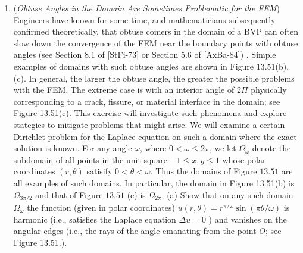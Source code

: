 \documentclass[../main.tex]{subfiles}
\begin{document}
\begin{enumerate}
(a) Write a MATLAB program that will perform the above adaptive scheme on the BVP and initial triangulation of Example 13.5. What happens when you run this program? Repeat, but now change the flagging criterion in (iii) to be that the oscillation of the FEM solution over an element exceeds $1 / 10$. Repeat with $1 / 10$ replaced by $1 / 100$. Plot each refined mesh as well as the final FEM solution.\\
(b) Repeat the instructions of part (a) on the BVP of Exercise 2; compare the final FEM solution with the exact solution given there.\\
(c) Repeat the instructions of part (a) on the BVP of Exercise 3 (using the initial triangulation given there).\\
(d) Do you have any ideas for an altemative mesh refinement scheme (satisfying the two constraints mentioned above)?
	\item (\textit{Obtuse Angles in the Domain Are Sometimes Problematic for the FEM}) Engineers have known 
for some time, and mathematicians subsequently confirmed theoretically, that obtuse comers in 
the domain of a BVP can often slow down the convergence of the FEM near the boundary 
points with obtuse angles (see Section 8.1 of [StFi-73] or Section 5.6 of [AxBa-84]) . Simple 
examples of domains with such obtuse angles are shown in Figure 13.51(b), (c). In general, the 
larger the obtuse angle, the greater the possible problems with the FEM. The extreme case is 
with an interior angle of $2\Pi$ physically corresponding to a crack, fissure, or material interface 
in the domain; see Figure 13.51(c). This exercise will investigate such phenomena and explore 
stategies to mitigate problems that might arise. We will examine a certain Dirichlet problem for the Laplace equation on such a domain where the exact solution is known. For any angle $\omega$, where $0<\omega \leq 2 \pi$, we let $\Omega_{\omega}$ denote the subdomain of all points in the unit square $-1 \leq x, y \leq 1$ whose polar coordinates $(r, \theta)$ satisify $0<\theta<\omega$. Thus the domains of Figure $13.51$ are all examples of such domains. In particular, the domain in Figure 13.51(b) is $\Omega_{3 \pi / 2}$ and that of Figure $13.51$ (c) is $\Omega_{2 \pi}$.
(a) Show that on any such domain $\Omega_{\omega}$ the function (given in polar coordinates) $u(r, \theta)=r^{\pi / \omega} \sin (\pi \theta / \omega)$ is harmonic (i.e., satisfies the Laplace equation $\Delta u=0$ ) and vanishes on the angular edges (i.e., the rays of the angle emanating from the point $O$; see Figure 13.51.).\\

\end{enumerate}
\end{document}
